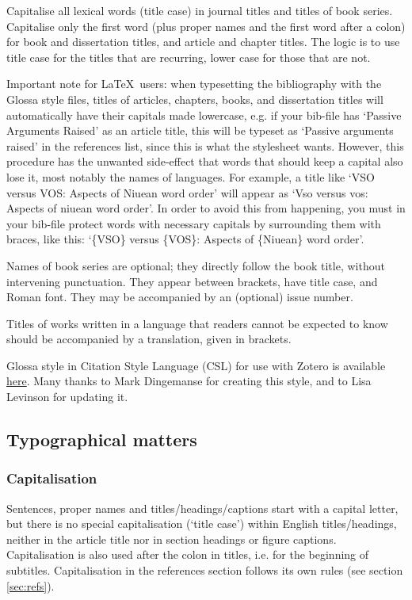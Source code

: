 \documentclass[charis,linguex]{glossa}
\begin{document}
Capitalise all lexical words (title case) in journal titles and titles of book series. Capitalise only the first word (plus proper names and the first word after a colon) for book and dissertation titles, and article and chapter titles. The logic is to use title case for the titles that are recurring, lower case for those that are not.

Important note for \LaTeX\ users: when typesetting the bibliography with the Glossa style files, titles of articles, chapters, books, and dissertation titles will automatically have their capitals made lowercase, e.g. if your bib-file has `Passive Arguments Raised' as an article title, this will be typeset as `Passive arguments raised' in the references list, since this is what the stylesheet wants. However, this procedure has the unwanted side-effect that words that should keep a capital also lose it, most notably the names of languages. For example, a title like `VSO versus VOS: Aspects of Niuean word order' will appear as `Vso versus vos: Aspects of niuean word order'. In order to avoid this from happening, you must in your bib-file protect words with necessary capitals by surrounding them with braces, like this:  `\{VSO\} versus \{VOS\}: Aspects of \{Niuean\} word order'.

Names of book series are optional; they directly follow the book title, without intervening punctuation. They appear between brackets, have title case, and Roman font. They may be accompanied by an (optional) issue number.

Titles of works written in a language that readers cannot be expected to know should be accompanied by a translation, given in brackets.

Glossa style in Citation Style Language (CSL) for use with Zotero is available \href{https://www.zotero.org/styles?q=Glossa}{here}. Many thanks to Mark Dingemanse for creating this style, and to Lisa Levinson for updating it.


\subsection{Typographical matters}

\subsubsection{Capitalisation}

Sentences, proper names and titles/headings/captions start with a capital letter, but there is no special capitalisation (`title case') within English titles/headings, neither in the article title nor in section headings or figure captions. Capitalisation is also used after the colon in titles, i.e. for the beginning of subtitles. Capitalisation in the references section follows its own rules (see section \ref{sec:refs}).
\end{document}
